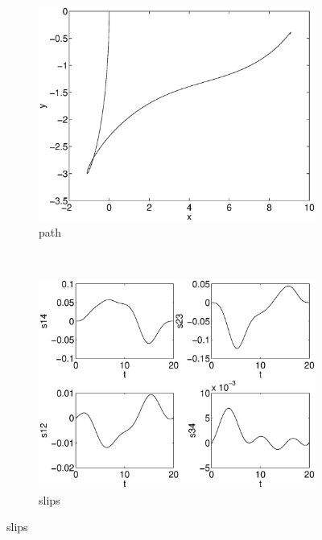 \begin{figure}[h]
\begin{subfigure}[b]{0.45\textwidth}
\centering
\includegraphics[width=\textwidth]{img/manip_task_path.eps}
\caption{path}
\end{subfigure}
~
\begin{subfigure}[b]{0.45\textwidth}
\centering
\includegraphics[width=\textwidth]{img/manip_task_slips.eps}
\caption{slips}
\end{subfigure}


\end{figure}
